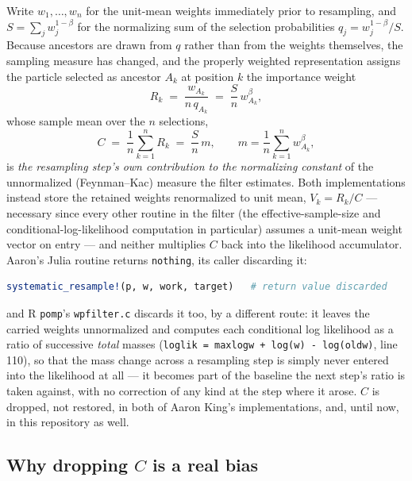 \documentclass[10pt]{article}
\begin{document}
Write $w_1,\dots,w_n$ for the unit-mean weights immediately prior to
resampling, and $S = \sum_j w_j^{1-\beta}$ for the normalizing sum of the
selection probabilities $q_j = w_j^{1-\beta}/S$. Because ancestors are drawn
from $q$ rather than from the weights themselves, the sampling measure has
changed, and the properly weighted representation assigns the particle
selected as ancestor $A_k$ at position $k$ the importance weight
\[
  R_k \;=\; \frac{w_{A_k}}{n\,q_{A_k}} \;=\; \frac{S}{n}\,w_{A_k}^{\beta},
\]
whose sample mean over the $n$ selections,
\[
  C \;=\; \frac1n\sum_{k=1}^n R_k \;=\; \frac{S}{n}\,m,
  \qquad m = \frac1n\sum_{k=1}^n w_{A_k}^{\beta},
\]
is \emph{the resampling step's own contribution to the normalizing constant}
of the unnormalized (Feynman--Kac) measure the filter estimates. Both
implementations instead store the retained weights renormalized to unit
mean, $V_k = R_k/C$ — necessary since every other routine in the filter (the
effective-sample-size and conditional-log-likelihood computation in
particular) assumes a unit-mean weight vector on entry — and neither
multiplies $C$ back into the likelihood accumulator. Aaron's Julia routine
returns \texttt{nothing}, its caller discarding it:
\begin{lstlisting}[language=Julia, caption={Aaron's \texttt{pfilt\_step\_comps!} (PartiallyObservedMarkovProcesses.jl\_aarons/src/pfilter.jl, line 228)}]
systematic_resample!(p, w, work, target)   # return value discarded
\end{lstlisting}
and R \texttt{pomp}'s \texttt{wpfilter.c} discards it too, by a different
route: it leaves the carried weights unnormalized and computes each
conditional log likelihood as a ratio of successive \emph{total} masses
(\texttt{loglik = maxlogw + log(w) - log(oldw)}, line 110), so that the mass
change across a resampling step is simply never entered into the likelihood
at all — it becomes part of the baseline the next step's ratio is taken
against, with no correction of any kind at the step where it arose. $C$ is
dropped, not restored, in both of Aaron King's implementations, and, until
now, in this repository as well.

\subsection*{Why dropping $C$ is a real bias}
\end{document}
